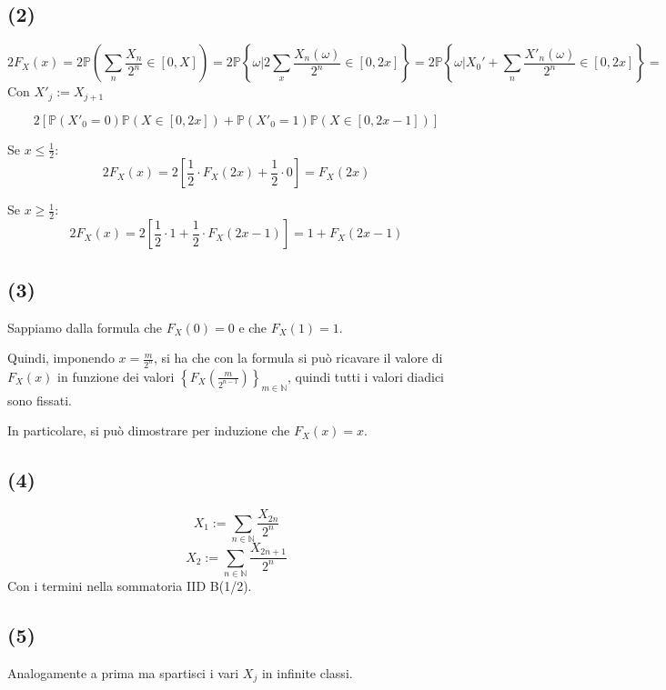 \documentclass{article}
\begin{document}
\subsection{(2)}
\[
	2F_X(x) = 2\mathbb{P}\left(\sum_{n} \frac{X_n}{2^n} \in  [0,X]\right) = 2 \mathbb{P}\left\{\omega  | 2\sum_{x}\frac{X_n (\omega )}{2^n} \in  [0,2x]\right\} = 2\mathbb{P}\left\{\omega  | X_0' + \sum_{n}\frac{X'_n(\omega )}{2^n} \in  [0,2x]\right\} = 
\]
Con $X'_j := X_{j+1}$

\[
	2\left[\mathbb{P}\left(X'_0=0\right) \mathbb{P}\left(X\in [0,2x]\right)  +  \mathbb{P}\left(X'_0=1\right)\mathbb{P}\left(X\in [0,2x-1]\right)\right]
\]

Se $x \leq  \frac{1}{2}$:
\[
	2F_X(x) = 2\left[\frac{1}{2} \cdot  F_X(2x) + \frac{1}{2} \cdot  0\right] = F_X(2x)
\]

Se $x \geq  \frac{1}{2}$:
\[
	2F_X(x) = 2\left[\frac{1}{2} \cdot  1 + \frac{1}{2} \cdot  F_X(2x-1)\right] = 1+F_X(2x-1)
\]


\subsection{(3)}
Sappiamo dalla formula che $F_X\left(0\right)=0$ e che $F_X(1)=1$.

Quindi, imponendo $x=\frac{m}{2^n}$, si ha che con la formula si può ricavare il valore di $F_X(x)$ in funzione dei valori $\left\{F_X(\frac{m}{2^{n-1}})\right\}_{m\in \mathbb{N}}$, quindi tutti i valori diadici sono fissati.

In particolare, si può dimostrare per induzione che $F_X(x) = x$.

\subsection{(4)}
\[
	X_1 := \sum_{n\in \mathbb{N}} \frac{X_{2n}}{2^n}
\]
\[
	X_2 := \sum_{n\in \mathbb{N}}\frac{X_{2n+1}}{2^n}
\]
Con i termini nella sommatoria IID B(1/2).

\subsection{(5)}
Analogamente a prima ma spartisci i vari $X_j$ in infinite classi.
\end{document}
